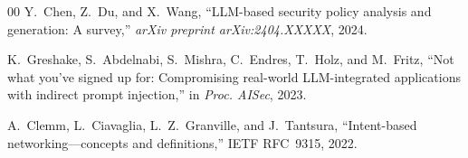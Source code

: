 \documentclass[conference]{IEEEtran}
\begin{document}
\begin{thebibliography}{00}
Y.~Chen, Z.~Du, and X.~Wang, ``LLM-based security policy analysis and generation: A survey,'' \textit{arXiv preprint arXiv:2404.XXXXX}, 2024.

K.~Greshake, S.~Abdelnabi, S.~Mishra, C.~Endres, T.~Holz, and M.~Fritz, ``Not what you've signed up for: Compromising real-world LLM-integrated applications with indirect prompt injection,'' in \textit{Proc. AISec}, 2023.

A.~Clemm, L.~Ciavaglia, L.~Z.~Granville, and J.~Tantsura, ``Intent-based networking---concepts and definitions,'' IETF RFC~9315, 2022.

\end{thebibliography}
\end{document}
